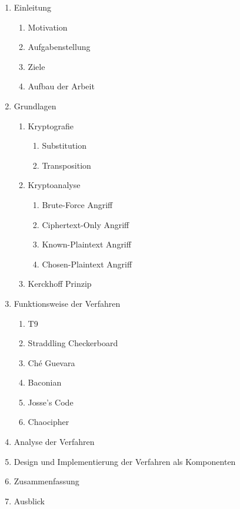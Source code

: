 \documentclass[fontsize=11pt, paper=a4, parskip=half]{scrartcl}
\begin{document}
\begin{enumerate}
	\item{Einleitung}
		\begin{enumerate}[label={\arabic*.}]
		\item{Motivation}
		\item{Aufgabenstellung}
		\item{Ziele}
		\item{Aufbau der Arbeit}
		\end{enumerate}
	\item{Grundlagen}
		\begin{enumerate}[label={\arabic*.}]
			\item{Kryptografie}
				\begin{enumerate}[label={\arabic*.}]
					\item{Substitution}
					\item{Transposition}
				\end{enumerate}
			\item{Kryptoanalyse}
				\begin{enumerate}[label={\arabic*.}]
					\item{Brute-Force Angriff}
					\item{Ciphertext-Only Angriff}
					\item{Known-Plaintext Angriff}
					\item{Chosen-Plaintext Angriff}
				\end{enumerate}
			\item{Kerckhoff Prinzip}
		\end{enumerate}
	\item{Funktionsweise der Verfahren}
		\begin{enumerate}[label={\arabic*.}]
			\item{T9}
			\item{Straddling Checkerboard}
			\item{Ché Guevara}
			\item{Baconian}
			\item{Josse's Code}
			\item{Chaocipher}
		\end{enumerate}
	\item{Analyse der Verfahren}
	\item{Design und Implementierung der Verfahren als Komponenten}
	\item{Zusammenfassung}
	\item{Ausblick}
\end{enumerate}

\newpage


\nocite{*}
\cleardoublepage
{}
{}

\end{document}
